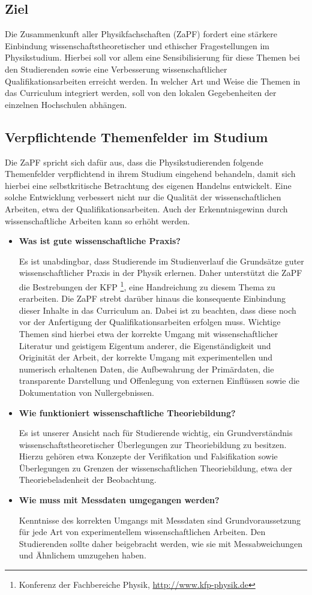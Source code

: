 \subsection*{Ziel}
Die Zusammenkunft aller Physikfachschaften (ZaPF) fordert eine stärkere Einbindung wissenschaftstheoretischer und ethischer Fragestellungen im Physikstudium. Hierbei soll vor allem eine Sensibilisierung für diese Themen bei den Studierenden sowie eine Verbesserung wissenschaftlicher Qualifikationsarbeiten erreicht werden. In welcher Art und Weise die Themen in das Curriculum integriert werden, soll von den lokalen Gegebenheiten der einzelnen Hochschulen abhängen.

\subsection*{Verpflichtende Themenfelder im Studium}
Die ZaPF spricht sich dafür aus, dass die Physikstudierenden folgende Themenfelder verpflichtend in ihrem Studium eingehend behandeln, damit sich hierbei eine selbstkritische Betrachtung des eigenen Handelns entwickelt. Eine solche Entwicklung verbessert nicht nur die Qualität der wissenschaftlichen Arbeiten, etwa der Qualifikationsarbeiten. Auch der Erkenntnisgewinn durch wissenschaftliche Arbeiten kann so erhöht werden.
\begin{itemize}
\item\textbf{Was ist gute wissenschaftliche Praxis?}
    \par Es ist unabdingbar, dass Studierende im Studienverlauf die Grundsätze guter wissenschaftlicher Praxis in der Physik  erlernen. Daher unterstützt die ZaPF die Bestrebungen der KFP \footnote{Konferenz der Fachbereiche Physik, \url{http://www.kfp-physik.de}}, eine  Handreichung zu diesem Thema zu erarbeiten. Die ZaPF strebt darüber  hinaus die konsequente Einbindung dieser Inhalte in das Curriculum an. Dabei ist zu beachten, dass diese noch vor der Anfertigung der  Qualifikationsarbeiten erfolgen muss. Wichtige Themen sind hierbei etwa der korrekte Umgang mit wissenschaftlicher Literatur und geistigem Eigentum anderer, die Eigenständigkeit und Originität der Arbeit, der korrekte Umgang mit experimentellen und numerisch erhaltenen Daten, die Aufbewahrung der Primärdaten, die transparente Darstellung und Offenlegung von externen Einflüssen sowie die Dokumentation von Nullergebnissen.
\item\textbf{Wie funktioniert wissenschaftliche Theoriebildung?}
    \par Es ist unserer Ansicht nach für Studierende wichtig, ein Grundverständnis wissenschaftstheoretischer Überlegungen zur Theoriebildung zu besitzen. Hierzu gehören etwa Konzepte der Verifikation und Falsifikation sowie Überlegungen zu Grenzen der wissenschaftlichen Theoriebildung, etwa der Theoriebeladenheit der Beobachtung.
\item\textbf{Wie muss mit Messdaten umgegangen werden?}
    \par Kenntnisse des korrekten Umgangs mit Messdaten sind Grundvoraussetzung für jede Art von experimentellem wissenschaftlichen Arbeiten. Den Studierenden sollte daher beigebracht werden, wie sie mit Messabweichungen und Ähnlichem umzugehen haben.
    \end{itemize}

